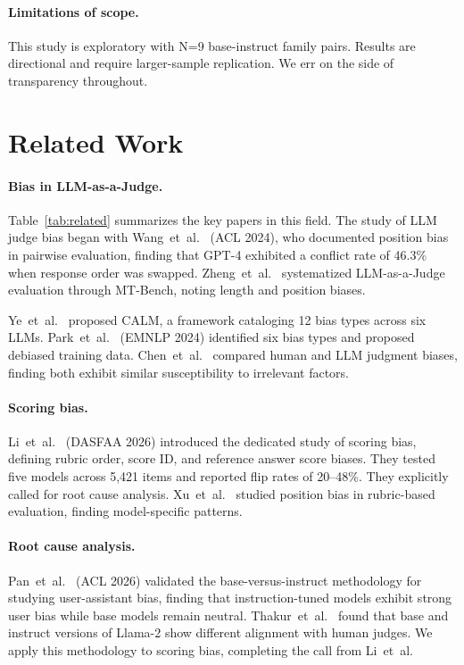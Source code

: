 \documentclass[11pt,twocolumn]{article}
\begin{document}
\paragraph{Limitations of scope.} This study is exploratory with N=9 base-instruct family pairs. Results are directional and require larger-sample replication. We err on the side of transparency throughout.

\section{Related Work}

\paragraph{Bias in LLM-as-a-Judge.}
Table~\ref{tab:related} summarizes the key papers in this field. The study of LLM judge bias began with Wang~et~al.~\cite{wang2023large} (ACL 2024), who documented position bias in pairwise evaluation, finding that GPT-4 exhibited a conflict rate of 46.3\% when response order was swapped. Zheng~et~al.~\cite{zheng2023judging} systematized LLM-as-a-Judge evaluation through MT-Bench, noting length and position biases.

Ye~et~al.~\cite{ye2024justice} proposed CALM, a framework cataloging 12 bias types across six LLMs. Park~et~al.~\cite{park2024offsetbias} (EMNLP 2024) identified six bias types and proposed debiased training data. Chen~et~al.~\cite{chen2024humans} compared human and LLM judgment biases, finding both exhibit similar susceptibility to irrelevant factors.

\paragraph{Scoring bias.}
Li~et~al.~\cite{li2025scoring} (DASFAA 2026) introduced the dedicated study of scoring bias, defining rubric order, score ID, and reference answer score biases. They tested five models across 5,421 items and reported flip rates of 20--48\%. They explicitly called for root cause analysis. Xu~et~al.~\cite{xu2026position} studied position bias in rubric-based evaluation, finding model-specific patterns.

\paragraph{Root cause analysis.}
Pan~et~al.~\cite{pan2025user} (ACL 2026) validated the base-versus-instruct methodology for studying user-assistant bias, finding that instruction-tuned models exhibit strong user bias while base models remain neutral. Thakur~et~al.~\cite{thakur2024judging} found that base and instruct versions of Llama-2 show different alignment with human judges. We apply this methodology to scoring bias, completing the call from Li~et~al.
\end{document}
